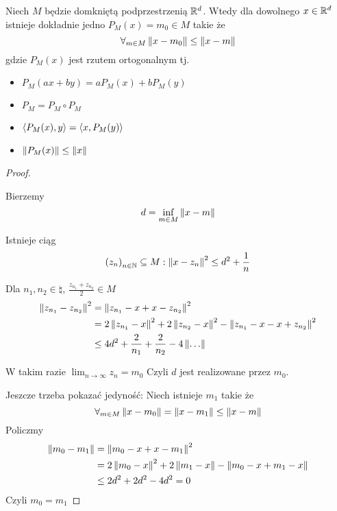 \begin{lemma}
	Niech \( M \) będzie domkniętą podprzestrzenią \( \mathbb{R}^d \).
	Wtedy dla dowolnego \( x \in \mathbb{R}^d \) istnieje dokładnie jedno \( P_M(x) = m_0 \in M \) takie że
	\[
		\forall_{m \in M} \left\Vert x - m_0 \right\Vert \leq \left\Vert x - m \right\Vert
	\]
	gdzie \( P_M(x) \) jest rzutem ortogonalnym tj.
	\begin{itemize}
		\item \( P_M(ax + by) = aP_M(x) + bP_M(y) \)
		\item \( P_M = P_M \circ P_M \)
		\item \( \left\langle P_M(x), y\right\rangle = \left\langle x, P_M(y)\right\rangle\)
		\item \( \left\Vert P_M(x) \right\Vert \leq \left\Vert x \right\Vert \)
	\end{itemize}
\end{lemma}
\begin{proof} \( \)

	Bierzemy
	\[
		d = \inf_{m \in M} \left\Vert x - m \right\Vert
	\]

	Istnieje ciąg
	\[
		\left(z_n\right)_{n \in \mathbb{N}} \subseteq M : \left\Vert x - z_n \right\Vert^2 \leq d^2 + \frac{1}{n}
	\]

	Dla \( n_1, n_2 \in \natural \), \( \frac{z_{n_1} + z_{n_2}}{2} \in M \)
	\begin{align*}
		\norm{z_{n_1} - z_{n_2}}^2
		 & = \norm{z_{n_1} - x + x - z_{n_2}}^2                      \\
		 & = 2\norm{z_{n_1} - x}^2 + 2\norm{z_{n_2} - x}^2
		- \norm{z_{n_1} - x - x + z_{n_2}}^2
		\\
		 & \leq 4d^2 + \frac{2}{n_1} + \frac{2}{n_2} - 4\norm{\dots}
	\end{align*}

	W takim razie \( \lim_{n \rightarrow \infty} z_n = m_0 \)
	Czyli \( d \) jest realizowane przez \( m_0 \).

	Jeszcze trzeba pokazać jedyność:
	Niech istnieje \( m_1 \) takie że
	\[
		\forall_{m \in M} \left\Vert x - m_0 \right\Vert = \left\Vert x - m_1 \right\Vert \leq \left\Vert x - m \right\Vert
	\]
	Policzmy
	\begin{align*}
		\left\Vert m_0 - m_1 \right\Vert
		 & = \left\Vert m_0 - x + x - m_1 \right\Vert^2          \\
		 & = 2\left\Vert m_0 - x \right\Vert^2 + 2\left\Vert m_1 - x \right\Vert
		- \left\Vert m_0 - x + m_1 - x \right\Vert               \\
		 & \leq 2d^2 + 2d^2 - 4d^2 = 0
	\end{align*}
	Czyli \( m_0 = m_1 \)

\end{proof}

